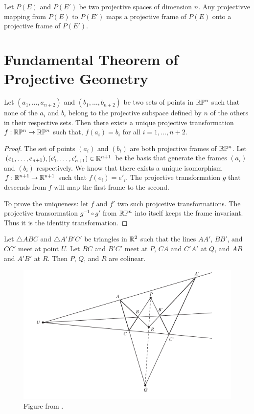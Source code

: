 \begin{prop}
  Let $P(E)$ and $P(E')$ be two projective spaces of dimension $n$. Any projectivve mapping from
  $P(E)$ to $P(E')$ maps a projective frame of $P(E)$ onto a projective frame of $P(E')$.
\end{prop}

\section{Fundamental Theorem of Projective Geometry}

\begin{theorem}
  \label{thm:fundprojgeo}
  Let $(a_1,\ldots,a_{n+2})$ and $(b_1,\ldots,b_{n+2})$ be two sets of points in $\mathbb{R}\mathbb{P}^n$ such
  that none of the $a_i$ and $b_i$ belong to the projective subspace defined by $n$ of the others
  in their respective sets. Then there exists a unique projective transformation
  $f:\mathbb{R}\mathbb{P}^n\rightarrow\mathbb{R}\mathbb{P}^n$ such that, $f(a_i)=b_i$ for all $i=1,\ldots,n+2$.
\end{theorem}

\begin{proof}
  The set of points $(a_i)$ and $(b_i)$ are both projective frames of $\mathbb{R}\mathbb{P}^n$. Let
  $(e_1,\ldots,e_{n+1}),(e'_1,\ldots,e'_{n+1})\in\mathbb{R}^{n+1}$ be the basis that generate the frames
  $(a_i)$ and $(b_i)$ respectively. We know that there exists a unique isomorphism
  $f:\mathbb{R}^{n+1}\rightarrow\mathbb{R}^{n+1}$ such that $f(e_i)=e'_i$. The projective transformation $g$
  that descends from $f$ will map the first frame to the second.

  To prove the uniqueness: let $f$ and $f'$ two such projcetive transformations. The projective
  transormation $g^{-1}\circ g'$ from $\mathbb{R}\mathbb{P}^n$ into itself keeps the frame invariant. Thus
  it is the identity transformation.
\end{proof}

\begin{theorem}
  Let $\triangle ABC$ and $\triangle A'B'C'$ be triangles in $\mathbb{R}^2$ such that the lines $AA'$,
  $BB'$, and $CC'$ meet at point $U$. Let $BC$ and $B'C'$ meet at $P$, $CA$ and $C'A'$ at $Q$,
  and $AB$ and $A'B'$ at $R$. Then $P$, $Q$, and $R$ are colinear.
\end{theorem}

\begin{figure}[H]
  \center
  \includegraphics[width=0.75\linewidth]{pictures/desargues.png}
  \caption{Figure from \cite{brannan}.}
\end{figure}

